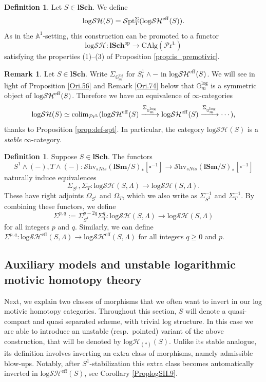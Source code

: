 \documentclass[11pt, a4paper]{amsart}
\theoremstyle{definition}
\newtheorem{df}[thm]{Definition}
\newtheorem{rmk}[thm]{Remark}
\numberwithin{equation}{subsection}
\newcommand{\A}{\mathbb{A}}
\newcommand{\lSch}{\mathbf{lSch}}
\newcommand{\lSm}{\mathbf{lSm}}
\newcommand{\colim}{\operatorname{colim}}		 %
\newcommand{\boxx}{\square}
\newcommand{\Gmm}{\mathbb{G}_m^{\mathrm{log}}}
\newcommand{\eff}{{\rm eff}}
\newcommand{\infShv}{\mathcal{S}\mathrm{hv}}
\newcommand{\infSpt}{\mathcal{S}\mathrm{pt}}
\newcommand{\LPr}{\mathcal{P}\mathrm{r}^{\mathrm{L}}}
\newcommand{\CAlg}{\mathrm{CAlg}}
\newcommand{\inflogH}{\mathrm{log}\mathcal{H}}
\newcommand{\inflogSH}{\mathrm{log}\mathcal{SH}}
\newcommand{\inflogSHS}{\mathrm{log}\mathcal{SH}^{\mathrm{eff}}}
\begin{document}
\begin{df}
Let $S\in \lSch$.
We define \index[notation]{logSH @ $\inflogSH$}
\[
\inflogSH(S) = \infSpt^{\Sigma}_T(\inflogSH^\eff(S)).
\]
As in the $\A^1$-setting, this construction can be promoted to
a functor
\[
\inflogSH\colon \lSch^\mathrm{op} \to \CAlg(\LPr)
\]
satisfying the properties (1)--(3) of Proposition \ref{prop:is_premotivic}. 
\end{df}
\begin{rmk} Let $S\in \lSch$.
Write $\Sigma_{\Gmm}$ for $S^1_t\wedge - $ in $\inflogSH^{\eff}(S)$. We will see in light of Proposition \ref{Ori.56} and Remark \ref{Ori.74} below that $\Gmm$ is a symmetric object of $\inflogSH^\eff(S)$. Therefore
we have an equivalence of $\infty$-categories
\begin{equation}
\label{alter.1.1}
\inflogSH(S)
\simeq
\colim_{\LPr}(\inflogSH^{\eff}(S) \xrightarrow{\Sigma_{\Gmm}}\inflogSH^{\eff}(S) \xrightarrow{\Sigma_{\Gmm}} \cdots ),
\end{equation}
thanks to Proposition \ref{prop:def-spt}. In particular, the category $\inflogSH(S)$ is a \emph{stable} $\infty$-category.
\end{rmk}

\begin{df}\label{def:sphere_suspension_logH}
Suppose $S\in \lSch$.
The functors
\[
S^1\wedge (-), T\wedge (-)
\colon 
\infShv_{sNis}(\lSm/S)_\ast[\boxx^{-1}]\to  \infShv_{sNis}(\lSm/S)_\ast[\boxx^{-1}]
\]
naturally induce equivalences
\[
\Sigma_{S^1},\Sigma_T\colon \inflogSH(S,\Lambda)
\to
\inflogSH(S,\Lambda).
\]
These have right adjoints $\Omega_{S^1}$ and $\Omega_T$, 
which we also write as $\Sigma_{S^1}^{-1}$ and $\Sigma_T^{-1}$.
By combining these functors, 
we define
\[
\Sigma^{p,q}:=\Sigma_{S^1}^{p-2q}\Sigma_T^q \colon \inflogSH(S, \Lambda)\to \inflogSH(S, \Lambda)
\]
for all integers $p$ and $q$.
Similarly, we can define $\Sigma^{p,q}\colon \inflogSHS(S, \Lambda)\to \inflogSHS(S, \Lambda)$ for all integers $q\geq 0$ and $p$.
\end{df}



\subsection{Auxiliary models and unstable logarithmic motivic homotopy theory}

Next, we explain  two classes of morphisms that we often want to invert in our log motivic homotopy categories. Throughout this section, $S$ will denote a quasi-compact and quasi separated scheme, with trivial log structure. In this case we are able to introduce an unstable (resp.\ pointed) variant of the above construction, that will be denoted by $\inflogH_{(*)}(S)$. Unlike its stable analogue, its definition involves inverting an extra class of morphisms, namely admissible blow-ups. Notably, after $S^1$-stabilization this extra class becomes automatically  inverted in $\inflogSHS(S)$, see    Corollary \ref{ProplogSH.9}.
\end{document}
